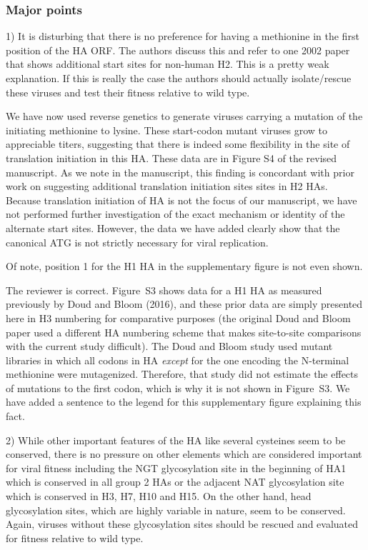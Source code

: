 \documentclass[11pt, oneside]{article}   	%
\newcommand{\response}[1]{{\color{black}#1}}
\begin{document}
\subsubsection*{Major points} 

1) It is disturbing that there is no preference for having a methionine in the first position of the HA ORF. The authors discuss this and refer to one 2002 paper that shows additional start sites for non-human H2. This is a pretty weak explanation. If this is really the case the authors should actually isolate/rescue these viruses and test their fitness relative to wild type. 

\response{
We have now used reverse genetics to generate viruses carrying a mutation of the initiating methionine to lysine.
These start-codon mutant viruses grow to appreciable titers, suggesting that there is indeed some flexibility in the site of translation initiation in this HA.
These data are in Figure S4 of the revised manuscript.
As we note in the manuscript, this finding is concordant with prior work on suggesting additional translation initiation sites sites in H2 HAs.
Because translation initiation of HA is not the focus of our manuscript, we have not performed further investigation of the exact mechanism or identity of the alternate start sites.
However, the data we have added clearly show that the canonical ATG is not strictly necessary for viral replication.
}

Of note, position 1 for the H1 HA in the supplementary figure is not even shown. 

\response{
The reviewer is correct. 
Figure~S3 shows data for a H1 HA as measured previously by Doud and Bloom (2016), and these prior data are simply presented here in H3 numbering for comparative purposes (the original Doud and Bloom paper used a different HA numbering scheme that makes site-to-site comparisons with the current study difficult). 
The Doud and Bloom study used mutant libraries in which all codons in HA \emph{except} for the one encoding the N-terminal methionine were mutagenized.
Therefore, that study did not estimate the effects of mutations to the first codon, which is why it is not shown in Figure~S3.
We have added a sentence to the legend for this supplementary figure explaining this fact.
}

2) While other important features of the HA like several cysteines seem to be conserved, there is no pressure on other elements which are considered important for viral fitness including the NGT glycosylation site in the beginning of HA1 which is conserved in all group 2 HAs or the adjacent NAT glycosylation site which is conserved in H3, H7, H10 and H15. On the other hand, head glycosylation sites, which are highly variable in nature, seem to be conserved. Again, viruses without these glycosylation sites should be rescued and evaluated for fitness relative to wild type. 
\end{document}
